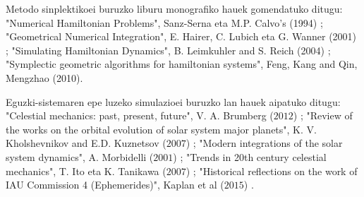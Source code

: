  
 Metodo sinplektikoei buruzko liburu monografiko hauek gomendatuko ditugu: "Numerical Hamiltonian Problems", Sanz-Serna eta M.P. Calvo’s (1994) \cite{JMSanz-Serna1994}; "Geometrical Numerical Integration", E. Hairer, C. Lubich eta G. Wanner  (2001) \cite{Hairer2006}; "Simulating Hamiltonian Dynamics", B. Leimkuhler and S. Reich (2004) \cite{Leimkuhler2004};  "Symplectic geometric algorithms for hamiltonian systems", Feng, Kang and Qin, Mengzhao (2010)\cite{Feng2010}.
 
 Eguzki-sistemaren epe luzeko simulazioei buruzko lan hauek aipatuko ditugu: "Celestial mechanics: past, present, future", V. A. Brumberg  ($2012$) \cite{Brumberg2013} ; "Review of the works on the orbital evolution of solar system major planets", K. V. Kholshevnikov and E.D. Kuznetsov ($2007$) \cite{Kholshevnikov2007}; "Modern integrations of the solar system dynamics", A. Morbidelli ($2001$) \cite{Morbidelli2002}; "Trends in 20th century celestial mechanics", T. Ito eta K. Tanikawa ($2007$) \cite{Ito2007}; "Historical reflections on the work of IAU Commission 4 (Ephemerides)", Kaplan et al ($2015$) \cite{Kaplan2015}.
